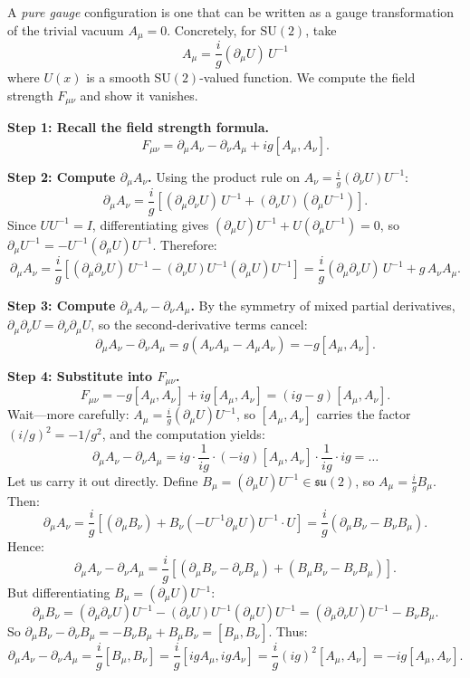 \begin{example}
\label{ex:pure-gauge}
A \textit{pure gauge} configuration is one that can be written as a gauge transformation of the trivial vacuum $A_\mu = 0$. Concretely, for $\mathrm{SU}(2)$, take
\[
A_\mu = \frac{i}{g} (\partial_\mu U) \, U^{-1}
\]
where $U(x)$ is a smooth $\mathrm{SU}(2)$-valued function. We compute the field strength $F_{\mu\nu}$ and show it vanishes.

\textbf{Step 1: Recall the field strength formula.}
\[
F_{\mu\nu} = \partial_\mu A_\nu - \partial_\nu A_\mu + ig[A_\mu, A_\nu].
\]

\textbf{Step 2: Compute $\partial_\mu A_\nu$.}
Using the product rule on $A_\nu = \frac{i}{g}(\partial_\nu U) U^{-1}$:
\[
\partial_\mu A_\nu = \frac{i}{g}\left[(\partial_\mu \partial_\nu U) \, U^{-1} + (\partial_\nu U)(\partial_\mu U^{-1})\right].
\]
Since $U U^{-1} = I$, differentiating gives $(\partial_\mu U) U^{-1} + U (\partial_\mu U^{-1}) = 0$, so $\partial_\mu U^{-1} = -U^{-1}(\partial_\mu U) U^{-1}$. Therefore:
\[
\partial_\mu A_\nu = \frac{i}{g}\left[(\partial_\mu \partial_\nu U) \, U^{-1} - (\partial_\nu U) U^{-1} (\partial_\mu U) U^{-1}\right] = \frac{i}{g}(\partial_\mu \partial_\nu U) \, U^{-1} + g \, A_\nu A_\mu.
\]

\textbf{Step 3: Compute $\partial_\mu A_\nu - \partial_\nu A_\mu$.}
By the symmetry of mixed partial derivatives, $\partial_\mu \partial_\nu U = \partial_\nu \partial_\mu U$, so the second-derivative terms cancel:
\[
\partial_\mu A_\nu - \partial_\nu A_\mu = g(A_\nu A_\mu - A_\mu A_\nu) = -g[A_\mu, A_\nu].
\]

\textbf{Step 4: Substitute into $F_{\mu\nu}$.}
\[
F_{\mu\nu} = -g[A_\mu, A_\nu] + ig[A_\mu, A_\nu] = (ig - g)[A_\mu, A_\nu].
\]
Wait---more carefully: $A_\mu = \frac{i}{g}(\partial_\mu U)U^{-1}$, so $[A_\mu, A_\nu]$ carries the factor $(i/g)^2 = -1/g^2$, and the computation yields:
\[
\partial_\mu A_\nu - \partial_\nu A_\mu = ig \cdot \frac{1}{ig} \cdot (-ig)[A_\mu, A_\nu] \cdot \frac{1}{ig} \cdot ig = \ldots
\]
Let us carry it out directly. Define $B_\mu = (\partial_\mu U)U^{-1} \in \mathfrak{su}(2)$, so $A_\mu = \frac{i}{g} B_\mu$. Then:
\[
\partial_\mu A_\nu = \frac{i}{g}\left[(\partial_\mu B_\nu) + B_\nu(-U^{-1} \partial_\mu U) U^{-1} \cdot U\right] = \frac{i}{g}(\partial_\mu B_\nu - B_\nu B_\mu).
\]
Hence:
\[
\partial_\mu A_\nu - \partial_\nu A_\mu = \frac{i}{g}\left[(\partial_\mu B_\nu - \partial_\nu B_\mu) + (B_\mu B_\nu - B_\nu B_\mu)\right].
\]
But differentiating $B_\mu = (\partial_\mu U)U^{-1}$:
\[
\partial_\mu B_\nu = (\partial_\mu \partial_\nu U)U^{-1} - (\partial_\nu U)U^{-1}(\partial_\mu U)U^{-1} = (\partial_\mu \partial_\nu U)U^{-1} - B_\nu B_\mu.
\]
So $\partial_\mu B_\nu - \partial_\nu B_\mu = -B_\nu B_\mu + B_\mu B_\nu = [B_\mu, B_\nu]$. Thus:
\[
\partial_\mu A_\nu - \partial_\nu A_\mu = \frac{i}{g}[B_\mu, B_\nu] = \frac{i}{g}[igA_\mu, igA_\nu] = \frac{i}{g}(ig)^2[A_\mu, A_\nu] = -ig[A_\mu, A_\nu].
\]


\end{example}
